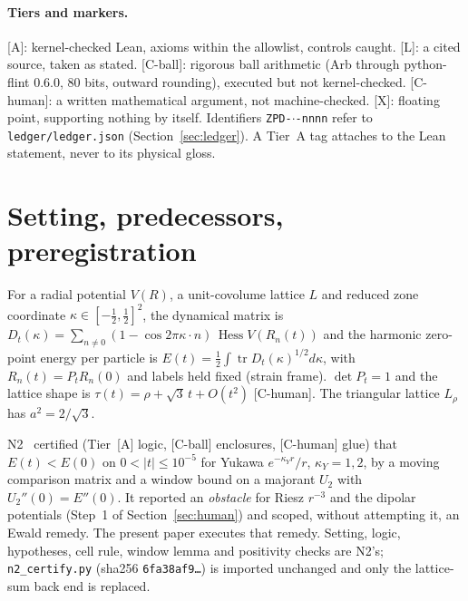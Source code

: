 \documentclass[11pt]{article}
\newcommand{\tier}[1]{\textsf{[#1]}}
\newcommand{\tA}{\tier{A}}
\newcommand{\tL}{\tier{L}}
\newcommand{\tCb}{\tier{C-ball}}
\newcommand{\tCh}{\tier{C-human}}
\newcommand{\tX}{\tier{X}}
\newcommand{\tr}{\operatorname{tr}}
\newcommand{\hess}{\operatorname{Hess}}
\begin{document}
\paragraph{Tiers and markers.} \tA: kernel-checked Lean, axioms within the allowlist, controls caught. \tL: a cited source, taken as stated. \tCb: rigorous ball arithmetic (Arb through python-flint 0.6.0, 80 bits, outward rounding), executed but not kernel-checked. \tCh: a written mathematical argument, not machine-checked. \tX: floating point, supporting nothing by itself. Identifiers \texttt{ZPD-$\cdot$-nnnn} refer to \texttt{ledger/ledger.json} (Section~\ref{sec:ledger}). A Tier~A tag attaches to the Lean statement, never to its physical gloss.

\section{Setting, predecessors, preregistration}\label{sec:setting}
For a radial potential $V(R)$, a unit-covolume lattice $L$ and reduced zone coordinate $\kappa\in[-\tfrac12,\tfrac12]^2$, the dynamical matrix is
$D_t(\kappa)=\sum_{n\ne0}(1-\cos2\pi\kappa\!\cdot\! n)\,\hess V(R_n(t))$ and the harmonic zero-point energy per particle is $E(t)=\tfrac12\int\tr D_t(\kappa)^{1/2}d\kappa$, with $R_n(t)=P_tR_n(0)$ and labels held fixed (strain frame). $\det P_t=1$ and the lattice shape is $\tau(t)=\rho+\sqrt3\,t+O(t^2)$ \tCh. The triangular lattice $L_\rho$ has $a^2=2/\sqrt3$.

N2~\cite{n2} certified (Tier~\tA{} logic, \tCb{} enclosures, \tCh{} glue) that $E(t)<E(0)$ on $0<|t|\le10^{-5}$ for Yukawa $e^{-\kappa_Yr}/r$, $\kappa_Y=1,2$, by a moving comparison matrix and a window bound on a majorant $U_2$ with $U_2''(0)=E''(0)$. It reported an \emph{obstacle} for Riesz $r^{-3}$ and the dipolar potentials (Step~1 of Section~\ref{sec:human}) and scoped, without attempting it, an Ewald remedy. The present paper executes that remedy. Setting, logic, hypotheses, cell rule, window lemma and positivity checks are N2's; \texttt{n2\_certify.py} (sha256 \texttt{6fa38af9\dots}) is imported unchanged and only the lattice-sum back end is replaced.
\end{document}
